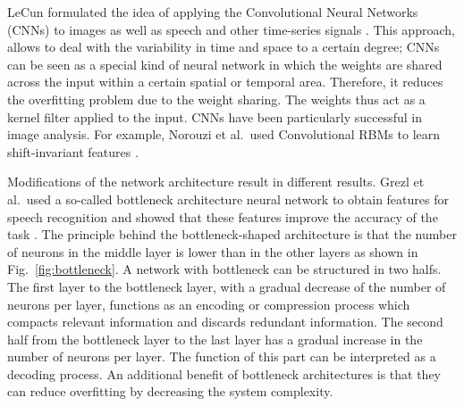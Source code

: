 \documentclass{article}
\begin{document}
LeCun formulated the idea of applying the Convolutional Neural Networks (CNNs) to images as well as speech and other time-series signals \cite{lecun1995convolutional}. This approach, allows to deal with the variability in time and space to a certain degree; CNNs can be seen as a special kind of neural network in which the weights are shared across the input within a certain spatial or temporal area. Therefore, it reduces the overfitting problem due to the weight sharing. The weights thus act as a kernel filter applied to the input. CNNs have been particularly successful in image analysis. For example, Norouzi et al.\ used Convolutional RBMs to learn shift-invariant features \cite{norouzi2009stacks}. 

Modifications of the network architecture result in different results. Grezl et al.\ used a so-called bottleneck architecture neural network to obtain features for speech recognition and showed that these features improve the accuracy of the task \cite{grezl2007probabilistic}. The principle behind the bottleneck-shaped architecture is that the number of neurons in the middle layer is lower than in the other layers as shown in Fig.~\ref{fig:bottleneck}. A network with bottleneck can be structured in two halfs. The first layer to the bottleneck layer, with a gradual decrease of the number of neurons per layer, functions as an encoding or compression process which compacts relevant information and discards redundant information. The second half from the bottleneck layer to the last layer has a gradual increase in the number of neurons per layer. The function of this part can be interpreted as a decoding process. An additional benefit of bottleneck architectures is that they can reduce overfitting by decreasing the system complexity.
\end{document}
